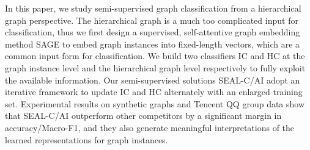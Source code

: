 \documentclass[sigconf]{acmart}
\begin{document}
In this paper, we study semi-supervised graph classification from a hierarchical graph perspective.  The hierarchical graph is a much too complicated input for classification, thus we first design a supervised, self-attentive graph embedding method SAGE to embed graph instances into fixed-length vectors, which are a common input form for classification.  We build two classifiers IC and HC at the graph instance level and the hierarchical graph level respectively to fully exploit the available information.  Our semi-supervised solutions SEAL-C/AI adopt an iterative framework to update IC and HC alternately with an enlarged training set.  Experimental results on synthetic graphs and Tencent QQ group data show that SEAL-C/AI outperform other competitors by a significant margin in accuracy/Macro-F1, and they also generate meaningful interpretations of the learned representations for graph instances.
\end{document}
